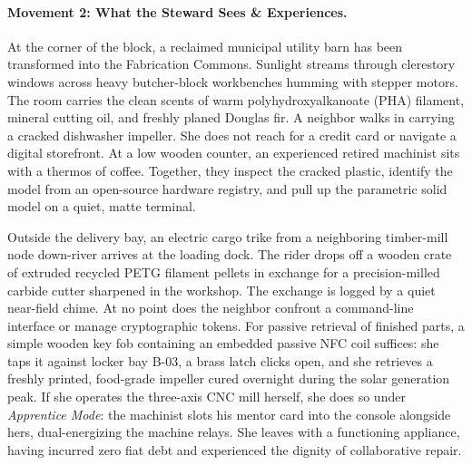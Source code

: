\paragraph{Movement 2: What the Steward Sees \& Experiences.}
At the corner of the block, a reclaimed municipal utility barn has been transformed into the Fabrication Commons. Sunlight streams through clerestory windows across heavy butcher-block workbenches humming with stepper motors. The room carries the clean scents of warm polyhydroxyalkanoate (PHA) filament, mineral cutting oil, and freshly planed Douglas fir. A neighbor walks in carrying a cracked dishwasher impeller. She does not reach for a credit card or navigate a digital storefront. At a low wooden counter, an experienced retired machinist sits with a thermos of coffee. Together, they inspect the cracked plastic, identify the model from an open-source hardware registry, and pull up the parametric solid model on a quiet, matte terminal. 

Outside the delivery bay, an electric cargo trike from a neighboring timber-mill node down-river arrives at the loading dock. The rider drops off a wooden crate of extruded recycled PETG filament pellets in exchange for a precision-milled carbide cutter sharpened in the workshop. The exchange is logged by a quiet near-field chime. At no point does the neighbor confront a command-line interface or manage cryptographic tokens. For passive retrieval of finished parts, a simple wooden key fob containing an embedded passive NFC coil suffices: she taps it against locker bay B-03, a brass latch clicks open, and she retrieves a freshly printed, food-grade impeller cured overnight during the solar generation peak. If she operates the three-axis CNC mill herself, she does so under \textit{Apprentice Mode}: the machinist slots his mentor card into the console alongside hers, dual-energizing the machine relays. She leaves with a functioning appliance, having incurred zero fiat debt and experienced the dignity of collaborative repair.

